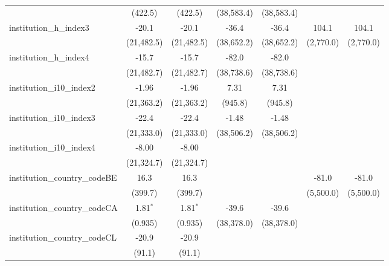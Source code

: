 \begin{tabular}{lcccccc}
                                         & (422.5)     & (422.5)     & (38,583.4)  & (38,583.4)  &             &   \\   
   institution\_h\_index3                & -20.1       & -20.1       & -36.4       & -36.4       & 104.1       & 104.1\\   
                                         & (21,482.5)  & (21,482.5)  & (38,652.2)  & (38,652.2)  & (2,770.0)   & (2,770.0)\\   
   institution\_h\_index4                & -15.7       & -15.7       & -82.0       & -82.0       &             &   \\   
                                         & (21,482.7)  & (21,482.7)  & (38,738.6)  & (38,738.6)  &             &   \\   
   institution\_i10\_index2              & -1.96       & -1.96       & 7.31        & 7.31        &             &   \\   
                                         & (21,363.2)  & (21,363.2)  & (945.8)     & (945.8)     &             &   \\   
   institution\_i10\_index3              & -22.4       & -22.4       & -1.48       & -1.48       &             &   \\   
                                         & (21,333.0)  & (21,333.0)  & (38,506.2)  & (38,506.2)  &             &   \\   
   institution\_i10\_index4              & -8.00       & -8.00       &             &             &             &   \\   
                                         & (21,324.7)  & (21,324.7)  &             &             &             &   \\   
   institution\_country\_codeBE          & 16.3        & 16.3        &             &             & -81.0       & -81.0\\   
                                         & (399.7)     & (399.7)     &             &             & (5,500.0)   & (5,500.0)\\   
   institution\_country\_codeCA          & 1.81$^{*}$  & 1.81$^{*}$  & -39.6       & -39.6       &             &   \\   
                                         & (0.935)     & (0.935)     & (38,378.0)  & (38,378.0)  &             &   \\   
   institution\_country\_codeCL          & -20.9       & -20.9       &             &             &             &   \\   
                                         & (91.1)      & (91.1)      &             &             &             &   \\   

\end{tabular}
